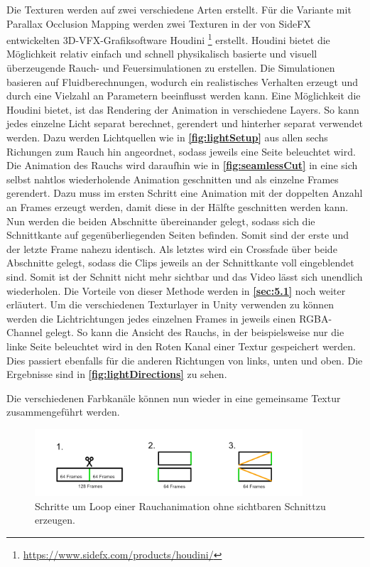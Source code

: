 Die Texturen werden auf zwei verschiedene Arten erstellt. Für die Variante mit Parallax Occlusion Mapping werden zwei
Texturen in der von SideFX entwickelten 3D-VFX-Grafiksoftware Houdini \footnote{\url{https://www.sidefx.com/products/houdini/}} erstellt.
Houdini bietet die Möglichkeit relativ einfach und schnell physikalisch basierte und visuell überzeugende Rauch- und Feuersimulationen zu erstellen.
Die Simulationen basieren auf Fluidberechnungen, wodurch ein realistisches Verhalten erzeugt und durch eine Vielzahl an Parametern beeinflusst werden kann.
Eine Möglichkeit die Houdini bietet, ist das Rendering der Animation in verschiedene Layers. So kann jedes einzelne Licht separat berechnet, gerendert und
hinterher separat verwendet werden. Dazu werden Lichtquellen wie in \textbf{\autoref{fig:lightSetup}} aus allen sechs Richungen zum Rauch hin angeordnet,
sodass jeweils eine Seite beleuchtet wird. Die Animation des Rauchs wird daraufhin wie in \textbf{\autoref{fig:seamlessCut}} in eine sich selbst nahtlos wiederholende Animation
geschnitten und als einzelne Frames gerendert. Dazu muss im ersten Schritt eine Animation mit der doppelten Anzahl an Frames erzeugt werden, damit diese in der Hälfte
geschnitten werden kann. Nun werden die beiden Abschnitte übereinander gelegt, sodass sich die Schnittkante auf gegenüberliegenden Seiten befinden. Somit sind der erste
und der letzte Frame nahezu identisch. Als letztes wird ein Crossfade über beide Abschnitte gelegt, sodass die Clips jeweils an der Schnittkante voll eingeblendet
sind. Somit ist der Schnitt nicht mehr sichtbar und das Video lässt sich unendlich wiederholen. Die Vorteile von dieser Methode werden in \textbf{\autoref{sec:5.1}}
noch weiter erläutert.
Um die verschiedenen Texturlayer in Unity verwenden zu können werden die Lichtrichtungen jedes einzelnen Frames in jeweils einen RGBA-Channel gelegt.
So kann die Ansicht des Rauchs, in der beispielsweise nur die linke Seite beleuchtet wird in den Roten Kanal einer Textur gespeichert werden.
Dies passiert ebenfalls für die anderen Richtungen von links, unten und oben. Die Ergebnisse sind in \textbf{\autoref{fig:lightDirections}} zu sehen.

Die verschiedenen Farbkanäle können nun wieder in eine gemeinsame Textur zusammengeführt werden. 

\begin{figure}[h!]
	\includegraphics[width=0.89\textwidth]{Grafiken/Implementation/Lightmaps/SeamlessCut.png}
	\centering
	\begin{footnotesize}
		\caption{Schritte um Loop einer Rauchanimation ohne sichtbaren Schnittzu erzeugen. }
		\label{fig:seamlessCut}
	\end{footnotesize}
\end{figure}





